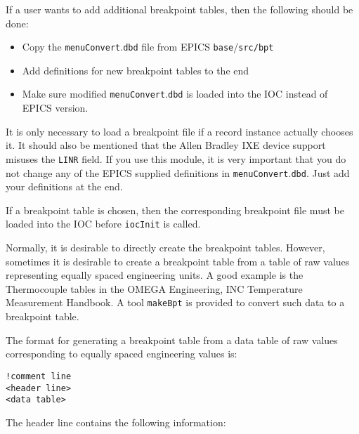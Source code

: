 If a user wants to add additional breakpoint tables, then the following should be done:

\begin{itemize}\item Copy the \verb|menuConvert|.\verb|dbd| file from EPICS \verb|base|/\verb|src/bpt|

\item Add definitions for new breakpoint tables to the end

\item Make sure modified \verb|menuConvert|.\verb|dbd| is loaded  into the IOC instead of EPICS version.

\end{itemize}It is only necessary to load a breakpoint file if a record instance actually chooses it. It should also be mentioned that the 
Allen Bradley IXE device support misuses the \verb|LINR| field. If you use this module, it is very important that you do not 
change any of the EPICS supplied definitions in \verb|menuConvert|.\verb|dbd|. Just add your definitions at the end.

If a breakpoint table is chosen, then the corresponding breakpoint file must be loaded into the IOC before \verb|iocInit| is 
called.

Normally, it is desirable to directly create the breakpoint tables. However, sometimes it is desirable to create a breakpoint 
table from a table of raw values representing equally spaced engineering units. A good example is the Thermocouple 
tables in the OMEGA Engineering, INC Temperature Measurement Handbook. A tool \verb|makeBpt| is provided to convert 
such data to a breakpoint table.

The format for generating a breakpoint table from a data table of raw values corresponding to equally spaced engineering 
values is:

\begin{verbatim}!comment line
<header line>
<data table>
\end{verbatim}The header line contains the following information:

